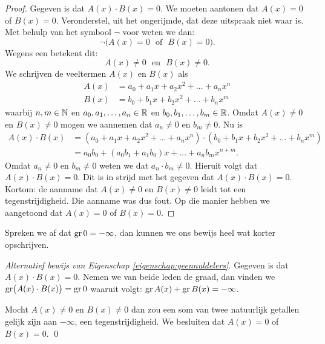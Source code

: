 \documentclass{ximera}
\begin{document}
\begin{proof}
Gegeven is dat $A(x)\cdot B(x) = 0$. We moeten aantonen dat $A(x) = 0$ of $B(x) = 0$. Veronderstel, uit het ongerijmde, dat deze uitspraak niet waar is. Met behulp van het symbool $\neg$ voor 
 weten we dan:
\[
\neg\bigl(A(x) = 0 \,\, \text{ of } \,\, B(x) = 0\bigr).
\]
Wegens een  betekent dit:
\[
A(x) \neq 0 \,\, \text{ en } \,\, B(x) \neq 0.
\] 
We schrijven de veeltermen $A(x)$ en $B(x)$ als
\begin{align*}
A(x) & = a_0 + a_1 x + a_2 x^2 + \dots + a_n x^n \\
B(x) & = b_0 + b_1 x + b_2 x^2 + \dots + b_n x^m
\end{align*}
waarbij $n,m \in \mathbb{N}$ en $a_0, a_1, \ldots, a_n \in \mathbb{R}$ en $b_0, b_1, \ldots, b_m \in \mathbb{R}$. Omdat $A(x) \neq 0$ en $B(x) \neq 0$ mogen we aannemen dat $a_n \neq 0$ en $b_m \neq 0$. Nu is
\begin{align*}
A(x) \cdot B(x) 
& = \left(a_0 + a_1 x + a_2 x^2 + \dots + a_n x^n\right) \cdot \left( b_0 + b_1 x + b_2 x^2 + \dots + b_n x^m\right) \\
& = a_0b_0 + (a_0b_1 + a_1b_0)x + \dots + a_n b_m x^{n+m}.
\end{align*}
Omdat $a_n \neq 0$ en $b_m \neq 0$ weten we dat $a_n \cdot b_m \neq 0$. Hieruit volgt dat $A(x) \cdot B(x) = 0$. Dit is in strijd met het gegeven dat $A(x)\cdot B(x) = 0$. Kortom: de aanname dat $A(x) \neq 0$ en $B(x) \neq 0$ leidt tot een tegenstrijdigheid. Die aanname was dus fout. Op die manier hebben we aangetoond dat $A(x) = 0$ of $B(x) = 0$. 
\end{proof}

Spreken we af dat $\operatorname{gr} 0 = - \infty$, dan kunnen we ons bewijs heel wat korter opschrijven. 

{\em Alternatief bewijs van Eigenschap \ref{eigenschap:geennuldelers}.}
Gegeven is dat $A(x)\cdot B(x) = 0$. Nemen we van beide leden de graad, dan vinden we $\operatorname{gr}\bigl( A(x)\cdot B(x) \bigr) = \operatorname{gr} 0$ waaruit volgt: $\operatorname{gr} A(x) + \operatorname{gr} B(x) = - \infty$.

Mocht $A(x) \neq 0$ en $B(x) \neq 0$ dan zou een som van twee natuurlijk getallen gelijk zijn aan $-\infty$, een tegenstrijdigheid. We besluiten dat $A(x) = 0$ of $B(x) = 0$.
\qed


\end{document}
